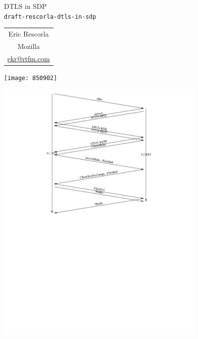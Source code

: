 \documentclass[helvetica]{seminar}
\begin{document}
\begin{slide}
\begin{center}
\vspace{.5 in}
\LARGE{{\bf}DTLS in SDP\\{\small \verb^draft-rescorla-dtls-in-sdp^}}\\
\vspace{.2in}
\large{
\begin{tabular}{c}
Eric Rescorla\\
Mozilla\\
\url{ekr@rtfm.com}
\end{tabular}
}
\end{center}

\end{slide}

\centerslidesfalse 

\begin{slide}

\begin{center}
\texttt{[image: 850902]}
\end{center}

\end{slide}

\begin{slide}

\includegraphics[width=4in]{normal-12}

\end{slide}
\end{document}
